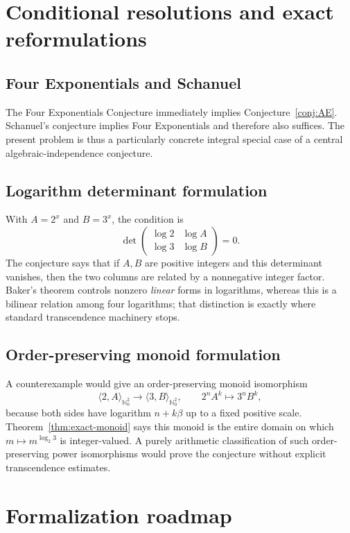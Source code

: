 \documentclass[11pt]{article}
\theoremstyle{definition}
\newcommand{\Nzero}{\mathbb N_0}
\begin{document}
\section{Conditional resolutions and exact reformulations}

\subsection{Four Exponentials and Schanuel}

The Four Exponentials Conjecture immediately implies
Conjecture~\ref{conj:AE}.  Schanuel's conjecture implies Four Exponentials and
therefore also suffices.  The present problem is thus a particularly concrete
integral special case of a central algebraic-independence conjecture.

\subsection{Logarithm determinant formulation}

With $A=2^x$ and $B=3^x$, the condition is
\[
 \det\begin{pmatrix}
 \log2&\log A\\
 \log3&\log B
 \end{pmatrix}=0.
\]
The conjecture says that if $A,B$ are positive integers and this determinant
vanishes, then the two columns are related by a nonnegative integer factor.
Baker's theorem controls nonzero \emph{linear} forms in logarithms, whereas
this is a bilinear relation among four logarithms; that distinction is exactly
where standard transcendence machinery stops.

\subsection{Order-preserving monoid formulation}

A counterexample would give an order-preserving monoid isomorphism
\[
 \langle2,A\rangle_{\Nzero^2}\longrightarrow
 \langle3,B\rangle_{\Nzero^2},
 \qquad2^nA^k\mapsto3^nB^k,
\]
because both sides have logarithm $n+k\beta$ up to a fixed positive scale.
Theorem~\ref{thm:exact-monoid} says this monoid is the entire domain on which
$m\mapsto m^{\log_2 3}$ is integer-valued.  A purely arithmetic classification
of such order-preserving power isomorphisms would prove the conjecture without
explicit transcendence estimates.

\section{Formalization roadmap}
\end{document}
